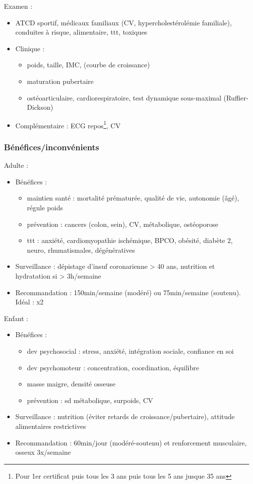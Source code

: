 \documentclass[11pt]{article}
\begin{document}
Examen :
\begin{itemize}
\item ATCD sportif, médicaux familiaux (CV, hypercholestérolémie familiale),
conduites à risque, alimentaire, ttt, toxiques
\item Clinique : 
\begin{itemize}
\item poids, taille, IMC, (courbe de croissance)
\item maturation pubertaire
\item ostéoarticulaire, cardiorespiratoire, test dynamique sous-maximal
(Ruffier-Dickson)
\end{itemize}
\item Complémentaire : ECG repos\footnote{Pour 1er certificat puis tous les 3 ans puis tous les 5
ans jusque 35 ans}, CV
\end{itemize}

\subsubsection{Bénéfices/inconvénients}
\label{sec:orgd018590}
Adulte :
\begin{itemize}
\item Bénéfices :
\begin{itemize}
\item maintien santé : \dec mortalité prématurée, \inc qualité de vie, \inc
autonomie (âgé), régule poids
\item prévention : cancers (colon, sein), CV, métabolique, ostéoporose \female
\item ttt : anxiété, cardiomyopathie ischémique, BPCO, obésité, diabète 2, neuro,
rhumatismales, dégénératives
\end{itemize}
\item Surveillance : dépistage d'insuf coronarienne > 40 ans, \danger nutrition et
hydratation si > 3h/semaine
\item Recommandation : 150min/semaine (modéré) ou 75min/semaine (soutenu). Idéal : x2
\end{itemize}

Enfant : 
\begin{itemize}
\item Bénéfices :
\begin{itemize}
\item dev psychosocial : \dec stress, anxiété, \inc intégration sociale, \inc
confiance en soi
\item dev psychomoteur : concentration, coordination, équilibre
\item \inc masse maigre, \inc densité osseuse
\item prévention : sd métabolique, surpoids, CV
\end{itemize}
\item Surveillance : nutrition (éviter retards de croissance/pubertaire), attitude
alimentaires restrictives
\item Recommandation : 60min/jour (modéré-soutenu) et renforcement musculaire,
osseux 3x/semaine
\end{itemize}
\end{document}
